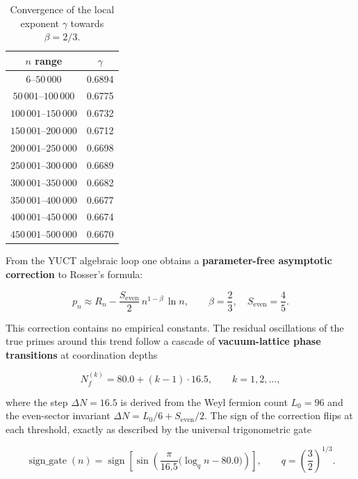 \documentclass[12pt]{article}
\begin{document}
	\begin{table}[H]
		\centering
		\caption{Convergence of the local exponent \(\gamma\) towards \(\beta = 2/3\).}
		\label{tab:prime-slopes}
		\begin{tabular}{c c}
			\toprule
			\(n\) range & \(\gamma\) \\
			\midrule
			\(6\)--\(50\,000\)    & 0.6894 \\
			\(50\,001\)--\(100\,000\) & 0.6775 \\
			\(100\,001\)--\(150\,000\)& 0.6732 \\
			\(150\,001\)--\(200\,000\)& 0.6712 \\
			\(200\,001\)--\(250\,000\)& 0.6698 \\
			\(250\,001\)--\(300\,000\)& 0.6689 \\
			\(300\,001\)--\(350\,000\)& 0.6682 \\
			\(350\,001\)--\(400\,000\)& 0.6677 \\
			\(400\,001\)--\(450\,000\)& 0.6674 \\
			\(450\,001\)--\(500\,000\)& 0.6670 \\
			\bottomrule
		\end{tabular}
	\end{table}
	
	From the YUCT algebraic loop one obtains a \textbf{parameter-free asymptotic correction} to Rosser's formula:
	
	\begin{equation}
		\boxed{ p_n \approx R_n - \frac{S_{\mathrm{even}}}{2}\, n^{1-\beta}\,\ln n },
		\qquad \beta = \frac{2}{3},\quad S_{\mathrm{even}}=\frac{4}{5}.
		\label{eq:prime-yuct-theory}
	\end{equation}
	
	This correction contains no empirical constants. The residual oscillations of the true primes around this trend follow a cascade of \textbf{vacuum-lattice phase transitions} at coordination depths
	
	\[
	N_f^{(k)} = 80.0 + (k-1)\cdot 16.5, \qquad k=1,2,\dots,
	\]
	
	where the step \(\Delta N = 16.5\) is derived from the Weyl fermion count \(L_0=96\) and the even-sector invariant \(\Delta N = L_0/6 + S_{\mathrm{even}}/2\). The sign of the correction flips at each threshold, exactly as described by the universal trigonometric gate
	
	\begin{equation}
		\operatorname{sign\_gate}(n) = \operatorname{sign}\!\left[\sin\!\left(\frac{\pi}{16.5}\bigl(\log_q n - 80.0\bigr)\right)\right],
		\qquad q = \left(\frac{3}{2}\right)^{1/3}.
	\end{equation}
	
\end{document}
